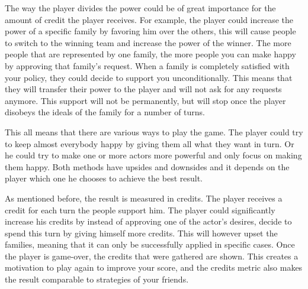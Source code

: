 \documentclass[11pt,a4paper]{article}
\begin{document}
The way the player divides the power could be of great importance for the amount of credit the player receives. For example, the player  could  increase the power of a specific family by favoring him over the others, this will cause people to switch to the winning team and increase the power of the winner. The more people that are represented by one family, the more people you can make happy by approving that family's request. When  a family is completely satisfied with your policy, they could decide to support you unconditionally. This means that they will transfer their power to the player and will not ask for any requests anymore. This support will not be permanently, but will stop once the player disobeys the ideals of the family for a number of turns.

This all means that there are various ways to play the game. The player could try to keep almost everybody happy by giving them all what they want in turn. Or he could try to make one or more actors more powerful and only focus on making them happy. Both methods have upsides and downsides and it depends on the player which one he chooses to achieve the best result.

As mentioned before, the result is measured in credits. The player receives a credit for each turn the people support him. The player could significantly increase his credits by instead of approving one of the actor's desires, decide to spend this turn by giving himself more credits. This will however upset the families, meaning that it can only be successfully applied in specific cases. Once the player is game-over, the credits that were gathered are shown. This creates a motivation to play again to improve your score, and the credits metric also makes the result comparable to strategies of your friends.
\end{document}
